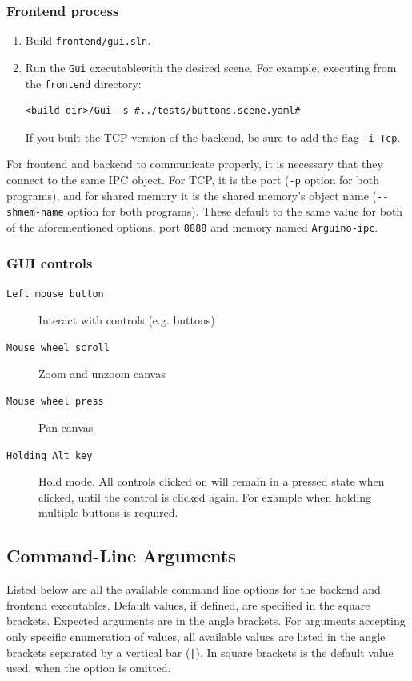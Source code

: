 \subsubsection{Frontend process}
\begin{enumerate}
    \item Build \texttt{frontend/gui.sln}.
    \item Run the \texttt{Gui} executable\footnotemark with the desired scene. For example, executing from the \texttt{frontend} directory:
    
    \begin{lstlisting}[language=shell]
    <build dir>/Gui -s #../tests/buttons.scene.yaml#
    \end{lstlisting}
    
    If you built the TCP version of the backend, be sure to add the flag \texttt{-i Tcp}.
    
\end{enumerate}

For frontend and backend to communicate properly, it is necessary that they connect to the same IPC object. For TCP, it is the port (\texttt{-p} option for both programs), and for shared memory it is the shared memory's object name (\texttt{-{}-shmem-name} option for both programs). These default to the same value for both of the aforementioned options, port \texttt{8888} and memory named \texttt{Arguino-ipc}.

\subsubsection{GUI controls}

\begin{description}
  \item[\texttt{Left mouse button}] Interact with controls (e.g. buttons)
  \item[\texttt{Mouse wheel scroll}] Zoom and unzoom canvas
  \item[\texttt{Mouse wheel press}] Pan canvas
  \item[\texttt{Holding Alt key}] Hold mode. All controls clicked on will remain in a pressed state when clicked, until the control is clicked again. For example when holding multiple buttons is required.
\end{description}


\subsection{Command-Line Arguments}
Listed below are all the available command line options for the backend and frontend executables. Default values, if defined, are specified in the square brackets. Expected arguments are in the angle brackets. For arguments accepting only specific enumeration of values, all available values are listed in the angle brackets separated by a vertical bar (\texttt{|}). In square brackets is the default value used, when the option is omitted.


